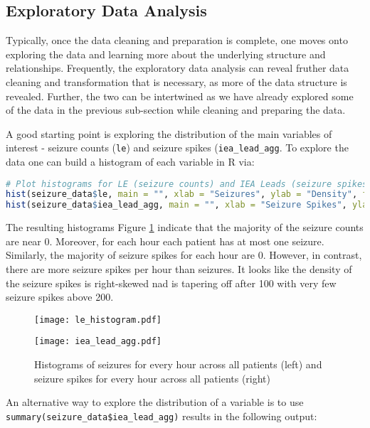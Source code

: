 \subsection{Exploratory Data Analysis}
Typically, once the data cleaning and preparation is complete, one moves onto exploring the data and learning more about the underlying structure and relationships. Frequently, the exploratory data analysis can reveal fruther data cleaning and transformation that is necessary, as more of the data structure is revealed. Further, the two can be intertwined as we have already explored some of the data in the previous sub-section while cleaning and preparing the data.

A good starting point is exploring the distribution of the main variables of interest - seizure counts (\verb|le|) and seizure spikes (\verb|iea_lead_agg|. To explore the data one can build a histogram of each variable in R via:
\begin{lstlisting}[language=R]
# Plot histograms for LE (seizure counts) and IEA Leads (seizure spikes)
hist(seizure_data$le, main = "", xlab = "Seizures", ylab = "Density", freq=FALSE)
hist(seizure_data$iea_lead_agg, main = "", xlab = "Seizure Spikes", ylab = "Density", freq=FALSE)
\end{lstlisting}
The resulting histograms Figure \ref{fig:seizures} indicate that the majority of the seizure counts are near 0. Moreover, for each hour each patient has at most one seizure. Similarly, the majority of seizure spikes for each hour are 0. However, in contrast, there are more seizure spikes per hour than seizures. It looks like the density of the seizure spikes is right-skewed nad is tapering off after 100 with very few seizure spikes above 200.
\begin{figure}[H]
  \begin{minipage}[b]{0.5\linewidth}
    \centering
    \texttt{[image: le\_histogram.pdf]}

  \end{minipage}
  \begin{minipage}[b]{0.5\linewidth}
    \centering
    \texttt{[image: iea\_lead\_agg.pdf]}
  \end{minipage}
  \label{fig:seizures}
  \caption{Histograms of seizures for every hour across all patients (left) and seizure spikes for every hour across all patients (right)}
\end{figure}
An alternative way to explore the distribution of a variable is to use \verb|summary(seizure_data$iea_lead_agg)| results in the following output:
